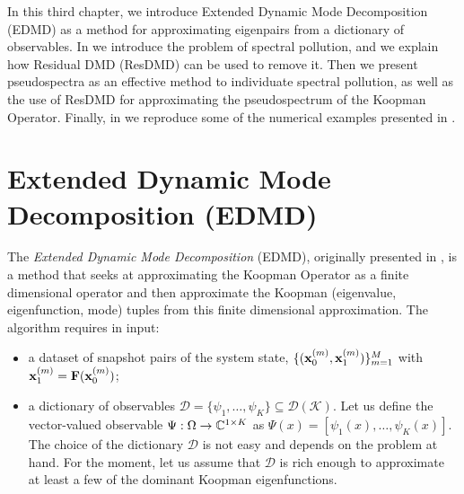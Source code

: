 \label{chapter_edmd}
In this third chapter, we introduce Extended Dynamic Mode Decomposition (EDMD) as a method for approximating eigenpairs from a dictionary of observables. In  we introduce the problem of spectral pollution, and we explain how Residual DMD (ResDMD) can be used to remove it. Then we present pseudospectra as an effective method to individuate spectral pollution, as well as the use of ResDMD for approximating the pseudospectrum of the Koopman Operator. Finally, in  we reproduce some of the numerical examples presented in \cite{colbrook_rigorous_2021}.

\section{Extended Dynamic Mode Decomposition (EDMD)}
\label{section_edmd}
The \emph{Extended Dynamic Mode Decomposition} (EDMD), originally presented in \cite{williams_data-driven_2015}, is a method that seeks at approximating the Koopman Operator as a finite dimensional operator and then approximate the Koopman (eigenvalue, eigenfunction, mode) tuples from this finite dimensional approximation. The algorithm requires in input:
\begin{itemize}
    \item a dataset of snapshot pairs of the system state, $\{(\vb{x}_0^{(m)}, \vb{x}_1^{(m)})\}_{m = 1}^M$ with $\vb{x}_1^{(m)} = \vb{F}(\vb{x}_0^{(m)})$;
    \item a dictionary of observables $\mathcal{D} = \{\psi_1, \dots, \psi_K\} \subseteq \mathcal{D}(\mathcal{K})$. Let us define the vector-valued observable $\Psi:\Omega\to\mathbb{C}^{1\times K}$ as $\Psi(x) = [\psi_1(x), \dots, \psi_K(x)]$. The choice of the dictionary $\mathcal{D}$ is not easy and depends on the problem at hand. For the moment, let us assume that $\mathcal{D}$ is rich enough to approximate at least a few of the dominant Koopman eigenfunctions.
\end{itemize}


